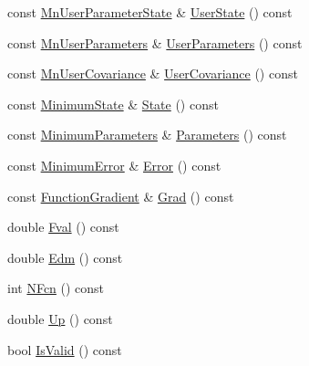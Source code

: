 \begin{DoxyCompactItemize}
\item 
const \mbox{\hyperlink{classROOT_1_1Minuit2_1_1MnUserParameterState}{Mn\+User\+Parameter\+State}} \& \mbox{\hyperlink{classROOT_1_1Minuit2_1_1FunctionMinimum_a698dc320ec24e2288f391f160ef8213e}{User\+State}} () const
\item 
const \mbox{\hyperlink{classROOT_1_1Minuit2_1_1MnUserParameters}{Mn\+User\+Parameters}} \& \mbox{\hyperlink{classROOT_1_1Minuit2_1_1FunctionMinimum_ac916253d7e29de7da4da5bf4b84a2ad5}{User\+Parameters}} () const
\item 
const \mbox{\hyperlink{classROOT_1_1Minuit2_1_1MnUserCovariance}{Mn\+User\+Covariance}} \& \mbox{\hyperlink{classROOT_1_1Minuit2_1_1FunctionMinimum_aeb3d5cb9f9c49838fa4b08668c8556db}{User\+Covariance}} () const
\item 
const \mbox{\hyperlink{classROOT_1_1Minuit2_1_1MinimumState}{Minimum\+State}} \& \mbox{\hyperlink{classROOT_1_1Minuit2_1_1FunctionMinimum_aa57279a22070860400c8854289c84314}{State}} () const
\item 
const \mbox{\hyperlink{classROOT_1_1Minuit2_1_1MinimumParameters}{Minimum\+Parameters}} \& \mbox{\hyperlink{classROOT_1_1Minuit2_1_1FunctionMinimum_a069ba097db08f87582b309330ef8aa6e}{Parameters}} () const
\item 
const \mbox{\hyperlink{classROOT_1_1Minuit2_1_1MinimumError}{Minimum\+Error}} \& \mbox{\hyperlink{classROOT_1_1Minuit2_1_1FunctionMinimum_a24f73efe7b4ed139bcf28e62ab01b347}{Error}} () const
\item 
const \mbox{\hyperlink{classROOT_1_1Minuit2_1_1FunctionGradient}{Function\+Gradient}} \& \mbox{\hyperlink{classROOT_1_1Minuit2_1_1FunctionMinimum_ac97896abe1c4625c519c2b07e4e9b670}{Grad}} () const
\item 
double \mbox{\hyperlink{classROOT_1_1Minuit2_1_1FunctionMinimum_a72aa9fd2b33f1bb56c5b053d536cc32c}{Fval}} () const
\item 
double \mbox{\hyperlink{classROOT_1_1Minuit2_1_1FunctionMinimum_aef90d7ca242a7ea211d56b188679f4b9}{Edm}} () const
\item 
int \mbox{\hyperlink{classROOT_1_1Minuit2_1_1FunctionMinimum_a8af0f1813c9ae51d7a57a1de0cbae42f}{N\+Fcn}} () const
\item 
double \mbox{\hyperlink{classROOT_1_1Minuit2_1_1FunctionMinimum_a53be50e5f3a36b22144bb98fc55c9340}{Up}} () const
\item 
bool \mbox{\hyperlink{classROOT_1_1Minuit2_1_1FunctionMinimum_a6525270e63f1cf16206387257b247b69}{Is\+Valid}} () const
\item 

\end{DoxyCompactItemize}
